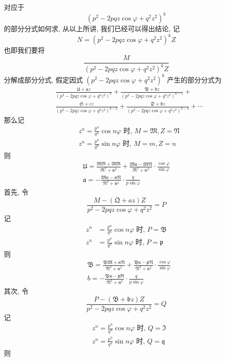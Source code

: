 对应于
\[
\left(p^{2}-2 p q z \cos \varphi+q^{2} z^{2}\right)^{k}
\]
的部分分式如何求, 从以上所讲, 我们已经可以得出结论, 记
\[
N=\left(p^{2}-2 p q z \cos \varphi+q^{2} z^{2}\right)^{k} Z
\]
也即我们要将
\[
\frac{M}{\left(p^{2}-2 p q z \cos \varphi+q^{2} z^{2}\right)^{k} Z}
\]
分解成部分分式, 假定因式 $\left(p^{2}-2 p q z \cos \varphi+q^{2} z^{2}\right)^{k}$ 产生的部分分式为
\[
\begin{aligned}
& \frac{\mathfrak{U}+\mathfrak{a} z}{\left(p^{2}-2 p q z \cos \varphi+q^{2} z^{2}\right)^{k}}+\frac{\mathfrak{B}+\mathfrak{b} z}{\left(p^{2}-2 p q z \cos \varphi+q^{2} z^{2}\right)^{k-1}}+ \\
& \frac{\mathfrak{S}+c z}{\left(p^{2}-2 p q z \cos \varphi+q^{2} z^{2}\right)^{k-2}}+\frac{\mathfrak{D}+\mathfrak{b} z}{\left(p^{2}-2 p q z \cos \varphi+q^{2} z^{2}\right)^{k-3}}+\cdots
\end{aligned}
\]
那么记 
\[
\begin{aligned}
& z^{n}=\frac{p^{n}}{q^{n}} \cos n \varphi \text { 时, } M=\mathfrak{M}, Z=\mathfrak{N} \\
& z^{n}=\frac{p^{n}}{q^{n}} \sin n \varphi \text { 时, } M=m, Z=n
\end{aligned}
\]
则
\[
\begin{gathered}
\mathfrak{U}=\frac{\mathfrak{M} \mathfrak{R}+\mathfrak{M} \mathfrak{R}}{\mathfrak{R}^{2}+\mathfrak{n}^{2}}+\frac{\mathfrak{M} \mathfrak{n}-\mathfrak{M} \mathfrak{N}}{\mathfrak{R}^{2}+\mathfrak{n}^{2}} \cdot \frac{\cos \varphi}{\sin \varphi} \\
\mathfrak{a}=-\frac{\mathfrak{M} \mathfrak{n}-\mathfrak{n} \mathfrak{N}}{\mathfrak{N}^{2}+\mathfrak{n}^{2}} \cdot \frac{q}{p \sin \varphi}
\end{gathered}
\]
首先, 令
\[
\frac{M-(\mathfrak{Q}+a z) Z}{p^{2}-2 p q z \cos \varphi+q^{2} z^{2}}=P
\]
记
\[
\begin{aligned}
z^{n} & =\frac{p^{n}}{q^{n}} \cos n \varphi \text { 时, } P=\mathfrak{B} \\
z^{n} & =\frac{p^{n}}{q^{n}} \sin n \varphi \text { 时, } P=\mathfrak{p}
\end{aligned}
\]
则
\[
\begin{aligned}
& \mathfrak{B}=\frac{\mathfrak{B} \mathfrak{M}+\mathfrak{n} \mathfrak{N}}{\mathfrak{N}^{2}+\mathfrak{n}^{2}}+\frac{\mathfrak{B} \mathfrak{n}-\mathfrak{p} \mathfrak{N}}{\mathfrak{N}^{2}+\mathfrak{n}^{2}} \cdot \frac{\cos \varphi}{\sin \varphi} \\
& b=-\frac{\mathfrak{B} \mathfrak{n}-\mathfrak{p} \mathfrak{R}}{\mathfrak{N}^{2}+\mathfrak{n}^{2}} \cdot \frac{q}{p \sin \varphi}
\end{aligned}
\]
其次, 令
\[
\frac{P-(\mathfrak{B}+\mathfrak{b} z) Z}{p^{2}-2 p q z \cos \varphi+q^{2} z^{2}}=Q
\]
记
\[
\begin{aligned}
& z^{n}=\frac{p^{n}}{q^{n}} \cos n \varphi \text { 时, } Q=\Im \\
& z^{n}=\frac{p^{n}}{q^{n}} \sin n \varphi \text { 时, } Q=\mathfrak{q}
\end{aligned}
\]
则

